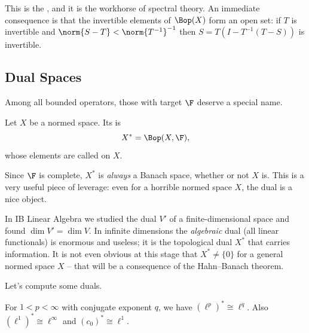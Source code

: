 This is the , and it is the workhorse of spectral theory. An immediate consequence is that the invertible elements of $\Bop(X)$ form an open set: if $T$ is invertible and $\norm{S - T} < \norm{T^{-1}}^{-1}$ then $S = T(I - T^{-1}(T-S))$ is invertible.

\subsection{Dual Spaces}

Among all bounded operators, those with target $\F$ deserve a special name.

\begin{definition}
	Let $X$ be a normed space. Its  is
	$$X^* = \Bop(X, \F),$$
	whose elements are called  on $X$.
\end{definition}

Since $\F$ is complete, $X^*$ is \emph{always} a Banach space, whether or not $X$ is. This is a very useful piece of leverage: even for a horrible normed space $X$, the dual is a nice object.

In IB Linear Algebra we studied the dual $V'$ of a finite-dimensional space and found $\dim V' = \dim V$. In infinite dimensions the \emph{algebraic} dual (all linear functionals) is enormous and useless; it is the topological dual $X^*$ that carries information. It is not even obvious at this stage that $X^* \neq \{0\}$ for a general normed space $X$ -- that will be a consequence of the Hahn--Banach theorem.

Let's compute some duals.

\begin{proposition}
	For $1 < p < \infty$ with conjugate exponent $q$, we have $(\ell^p)^* \cong \ell^q$. Also $(\ell^1)^* \cong \ell^\infty$ and $(c_0)^* \cong \ell^1$.
\end{proposition}


